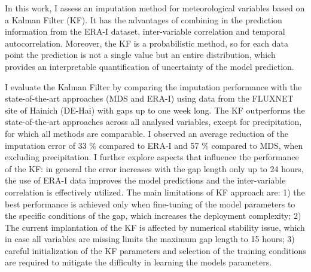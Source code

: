 \documentclass{article}
\begin{document}
In this work, I assess an imputation method for meteorological variables based on a Kalman Filter (KF). It has the advantages of combining in the prediction information from the ERA-I dataset, inter-variable correlation and  temporal autocorrelation. Moreover, the KF is a probabilistic method, so for each data point the prediction is not a single value but an entire distribution, which provides an interpretable quantification of uncertainty of the model prediction.

I evaluate the Kalman Filter by  comparing the imputation performance with the state-of-the-art approaches (MDS and ERA-I) using data from the FLUXNET site of Hainich (DE-Hai) with gaps up to one week long. The KF outperforms the state-of-the-art approaches across all analysed variables, except for precipitation, for which all methods are comparable. I observed an average reduction of the imputation error of 33 \% compared to ERA-I and  57 \% compared to MDS, when excluding precipitation. I further explore aspects that influence the performance of the KF: in general the error increases with the gap length only up to 24 hours, the use of ERA-I data improves the model predictions and the inter-variable correlation is effectively utilized.
The main limitations of KF approach are: 1) the best performance is achieved only when fine-tuning of the model parameters to the specific conditions of the gap, which increases the deployment complexity; 2) The current implantation of the KF is affected by numerical stability issue, which in case all variables are missing limits the maximum gap length to 15 hours; 3) careful initialization of the KF parameters and selection of the training conditions are required to mitigate the difficulty in learning the models parameters. 
\thispagestyle{empty}
\clearpage
\end{document}
